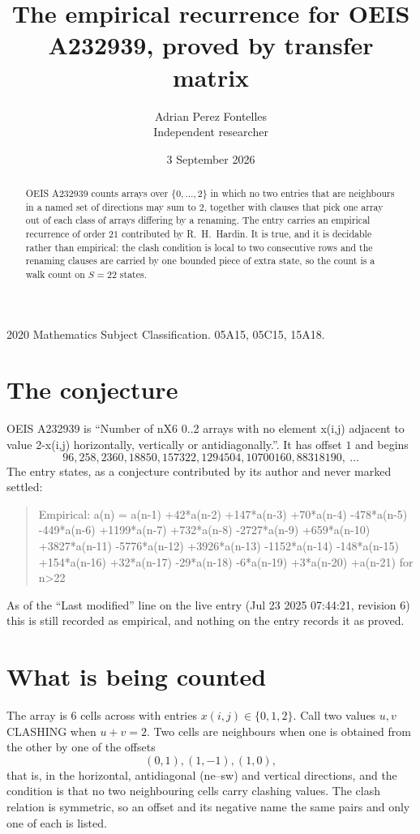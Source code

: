\documentclass[11pt,a4paper]{article}
\title{The empirical recurrence for OEIS A232939, proved by transfer matrix}
\author{Adrian Perez Fontelles\\ \small Independent researcher}
\date{3 September 2026}
\theoremstyle{plain}
\theoremstyle{definition}
\begin{document}
\maketitle

\begin{abstract}
OEIS A232939 counts arrays over $\{0,\dots,2\}$ in which no two entries that are neighbours in
a named set of directions may sum to $2$, together with clauses that pick one array out of
each class of arrays differing by a renaming. The entry carries an empirical recurrence of
order $21$ contributed by R.~H.~Hardin. It is true, and it is decidable rather than
empirical: the clash condition is local to two consecutive rows and the renaming clauses are
carried by one bounded piece of extra state, so the count is a walk count on $S=22$ states.
\end{abstract}

\noindent\small 2020 Mathematics Subject Classification. 05A15, 05C15, 15A18.\normalsize

\section{The conjecture}

OEIS A232939 is ``Number of nX6 0..2 arrays with no element x(i,j) adjacent to value 2-x(i,j) horizontally, vertically or antidiagonally.''. It has offset $1$ and begins
\[
96, 258, 2360, 18850, 157322, 1294504, 10700160, 88318190,\ \dots
\]
The entry states, as a conjecture contributed by its author and never marked settled:
\begin{quote}
Empirical: a(n) = a(n-1) +42*a(n-2) +147*a(n-3) +70*a(n-4) -478*a(n-5) -449*a(n-6) +1199*a(n-7) +732*a(n-8) -2727*a(n-9) +659*a(n-10) +3827*a(n-11) -5776*a(n-12) +3926*a(n-13) -1152*a(n-14) -148*a(n-15) +154*a(n-16) +32*a(n-17) -29*a(n-18) -6*a(n-19) +3*a(n-20) +a(n-21) for n>22
\end{quote}
As of the ``Last modified'' line on the live entry (Jul 23 2025 07:44:21, revision 6) this is still
recorded as empirical, and nothing on the entry records it as proved.

\section{What is being counted}

The array is $6$ cells across with entries $x(i,j)\in\{0,1,2\}$. Call two values $u,v$ CLASHING
when $u+v=2$. Two cells are neighbours when one is obtained from the other by one of
the offsets
\[
(0,1), (1,-1), (1,0),
\]
that is, in the horizontal, antidiagonal (ne--sw) and vertical directions, and the condition is that no two neighbouring cells carry
clashing values. The clash relation is symmetric, so an offset and its negative name the
same pairs and only one of each is listed.
\end{document}
